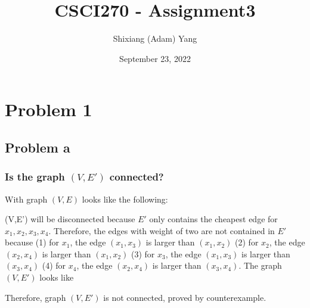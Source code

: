 \documentclass{article}
\author{Shixiang (Adam) Yang}
\date{September 23, 2022}
\title{CSCI270 - Assignment3}
\begin{document}
 \maketitle
\section{Problem 1}
\subsection{Problem a}
\subsubsection{Is the graph $(V,E')$ connected?}

With graph $(V,E)$ looks like the following:
\begin{center}
\end{center}

 (V,E') will be disconnected because $E'$  only contains the cheapest edge for $x_1, x_2, x_3, x_4$. Therefore, the edges with weight of two are not contained in $E'$ because (1) for $x_1$, the edge $(x_1,x_3)$ is larger than $(x_1,x_2)$ (2) for $x_2$, the edge $(x_2,x_4)$ is larger than $(x_1,x_2)$ (3) for $x_3$, the edge $(x_1,x_3)$ is larger than $(x_3,x_4)$ (4) for $x_4$, the edge $(x_2,x_4)$ is larger than $(x_3,x_4)$. The graph $(V,E')$ looks like
\begin{center}
\end{center}

Therefore, graph $(V,E')$ is not connected, proved by counterexample.
\end{document}
